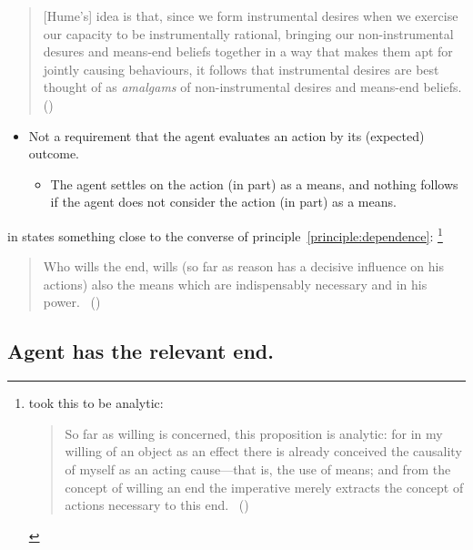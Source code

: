 \documentclass[10pt]{article}
\newcommand{\hand}{\ding{43}}
\newcommand{\hozlinedash}[0]{%
  \noindent\hdashrule[0.5ex][c]{\textwidth}{.1pt}{2.5pt}
}
\begin{document}
\begin{quote}
  [Hume's] idea is that, since we form instrumental desires when we exercise our capacity to be instrumentally rational, bringing our non-instrumental desures and means-end beliefs together in a way that makes them apt for jointly causing behaviours, it follows that instrumental desires are best thought of as \emph{amalgams} of non-instrumental desires and means-end beliefs.\nolinebreak
  \mbox{}\hfill\mbox{(\citeyear[35]{Smith:2015ab})}
\end{quote}


\begin{itemize}
\item[\hand] Not a requirement that the agent evaluates an action by its (expected) outcome.
  \begin{itemize}
  \item The agent settles on the action (in part) as a means, and nothing follows if the agent does not consider the action (in part) as a means.
  \end{itemize}
\end{itemize}

\hozlinedash

\citeauthor{Kant:1948aa} in  states something close to the converse of principle~\ref{principle:dependence}:\nolinebreak
\footnote{\citeauthor{Kant:1948aa} took this to be analytic:
  \begin{quote}
    So far as willing is concerned, this proposition is analytic: for in my willing of an object as an effect there is already conceived the causality of myself as an acting cause---that is, the use of means; and from the concept of willing an end the imperative merely extracts the concept of actions necessary to this end.\nolinebreak
    \mbox{ }\hfill(\citeyear[81]{Kant:1948aa})
  \end{quote}
}

\begin{quote}
  Who wills the end, wills (so far as reason has a decisive influence on his actions) also the means which are indispensably necessary and in his power.\nolinebreak
  \mbox{ }\hfill\mbox{(\citeyear[80--81/Ak 417]{Kant:1948aa})}
\end{quote}

\hozlinedash


\newpage


\subsection{Agent has the relevant end.}
\label{sec:posessed-end}
\end{document}
